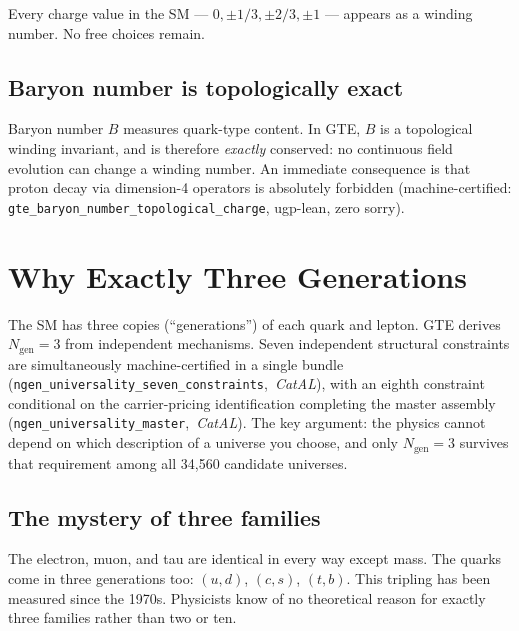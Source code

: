\documentclass[11pt,a4paper]{article}
\newcommand{\lean}[1]{\texttt{#1}}
\newcommand{\Ngen}{N_{\mathrm{gen}}}
\newcommand{\CatAL}{\textit{CatAL}}
\begin{document}
Every charge value in the SM --- $0, \pm 1/3, \pm 2/3, \pm 1$ --- appears
as a winding number.  No free choices remain.

\subsection{Baryon number is topologically exact}

Baryon number $B$ measures quark-type content.  In GTE, $B$ is a topological
winding invariant, and is therefore \emph{exactly} conserved: no continuous
field evolution can change a winding number.  An immediate consequence is
that proton decay via dimension-4 operators is absolutely forbidden
(machine-certified: \lean{gte\_baryon\_number\_topological\_charge},
ugp-lean, zero sorry).

\section{Why Exactly Three Generations}
\label{sec:gen}

\begin{tcolorbox}[colback=boxblue,colframe=blue!40!black,title=Key idea]
The SM has three copies (``generations'') of each quark and lepton.  GTE
derives $\Ngen = 3$ from independent mechanisms.  Seven independent structural
constraints are simultaneously machine-certified in a single bundle
\mbox{(\lean{ngen\_universality\_seven\_constraints}, \CatAL)}, with an eighth
constraint conditional on the carrier-pricing identification completing the
master assembly \mbox{(\lean{ngen\_universality\_master}, \CatAL)}.
The key argument: the physics cannot depend on which description of a universe
you choose, and only $\Ngen = 3$ survives that requirement among all 34,560
candidate universes.
\end{tcolorbox}

\subsection{The mystery of three families}

The electron, muon, and tau are identical in every way except mass.  The
quarks come in three generations too: $(u,d)$, $(c,s)$, $(t,b)$.  This
tripling has been measured since the 1970s.  Physicists know of no
theoretical reason for exactly three families rather than two or ten.
\end{document}
